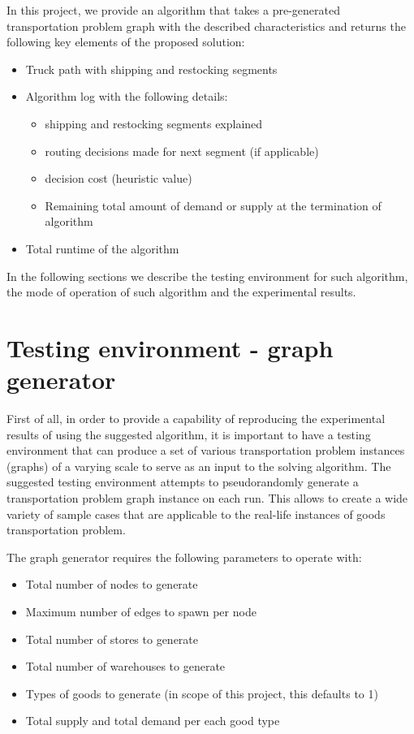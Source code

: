 \documentclass[journal,onecolumn]{IEEEtran}
\begin{document}
In this project, we provide an algorithm that takes a pre-generated transportation problem graph with the described characteristics and returns the following key elements of the proposed solution:
\begin{itemize}
	\item{Truck path with shipping and restocking segments}
	\item{Algorithm log with the following details:}
		\begin{itemize}
			\item{shipping and restocking segments explained}
			\item{routing decisions made for next segment (if applicable)}
			\item{decision cost (heuristic value)}
			\item{Remaining total amount of demand or supply at the termination of algorithm}
		\end{itemize}
	\item{Total runtime of the algorithm}
\end{itemize}

In the following sections we describe the testing environment for such algorithm, the mode of operation of such algorithm and the experimental results.


\section{Testing environment - graph generator}

First of all, in order to provide a capability of reproducing the experimental results of using the suggested algorithm, it is important to have a testing environment that can produce a set of various transportation problem instances (graphs) of a varying scale to serve as an input to the solving algorithm. The suggested testing environment attempts to pseudorandomly generate a transportation problem graph instance on each run. This allows to create a wide variety of sample cases that are applicable to the real-life instances of goods transportation problem.

The graph generator requires the following parameters to operate with:
\begin{itemize}
	\item{Total number of nodes to generate}
	\item{Maximum number of edges to spawn per node}
	\item{Total number of stores to generate}
	\item{Total number of warehouses to generate}
	\item{Types of goods to generate (in scope of this project, this defaults to 1)}
	\item{Total supply and total demand per each good type}
\end{itemize}
\end{document}
